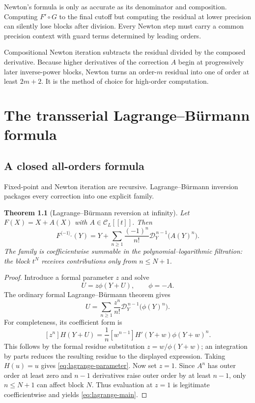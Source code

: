 \documentclass[11pt,oneside]{book}
\newtheorem{theorem}{Theorem}[chapter]
\theoremstyle{definition}
\theoremstyle{remark}
\newcommand{\D}{\mathcal D}
\newcommand{\compinv}{^{\langle-1\rangle_{\circ}}}
\newcommand{\compose}{\mathbin{\circ}}
\begin{document}
\begin{pitfallbox}
Newton's formula is only as accurate as its denominator and composition.
Computing $F'\compose G$ to the final cutoff but computing the residual at
lower precision can silently lose blocks after division.  Every Newton step
must carry a common precision context with guard terms determined by leading
orders.
\end{pitfallbox}

\begin{summarybox}
Compositional Newton iteration subtracts the residual divided by the composed
derivative.  Because higher derivatives of the correction $A$ begin at
progressively later inverse-power blocks, Newton turns an order-$m$ residual
into one of order at least $2m+2$.  It is the method of choice for high-order
computation.
\end{summarybox}


\chapter{The transserial Lagrange--B\"urmann formula}
\label{ch:reversion-lagrange}

\section{A closed all-orders formula}
Fixed-point and Newton iteration are recursive.  Lagrange--B\"urmann inversion
packages every correction into one explicit family.

\begin{theorem}[Lagrange--B\"urmann reversion at infinity]
\label{thm:lagrange-transserial}
Let $F(X)=X+A(X)$ with $A\in\mathcal C_L[[t]]$.  Then
\begin{equation}\label{eq:lagrange-main}
 F\compinv(Y)
 =Y+\sum_{n\ge1}\frac{(-1)^n}{n!}
 \D_Y^{\,n-1}\bigl(A(Y)^n\bigr).
\end{equation}
The family is coefficientwise summable in the polynomial--logarithmic
filtration: the block $t^N$ receives contributions only from $n\le N+1$.
\end{theorem}

\begin{proof}
Introduce a formal parameter $z$ and solve
\[
 U=z\phi(Y+U),
 \qquad \phi=-A.
\]
The ordinary formal Lagrange--B\"urmann theorem gives
\begin{equation}\label{eq:lagrange-parameter}
 U=\sum_{n\ge1}\frac{z^n}{n!}
 \D_Y^{\,n-1}\bigl(\phi(Y)^n\bigr).
\end{equation}
For completeness, its coefficient form is
\[
 [z^n]H(Y+U)
 =\frac1n[w^{n-1}]H'(Y+w)\phi(Y+w)^n.
\]
This follows by the formal residue substitution
$z=w/\phi(Y+w)$; an integration by parts reduces the resulting residue to the
displayed expression.  Taking $H(u)=u$ gives
\eqref{eq:lagrange-parameter}.  Now set $z=1$.  Since $A^n$ has outer order at
least zero and $n-1$ derivatives raise outer order by at least $n-1$, only
$n\le N+1$ can affect block $N$.  Thus evaluation at $z=1$ is legitimate
coefficientwise and yields \eqref{eq:lagrange-main}.
\end{proof}
\end{document}
